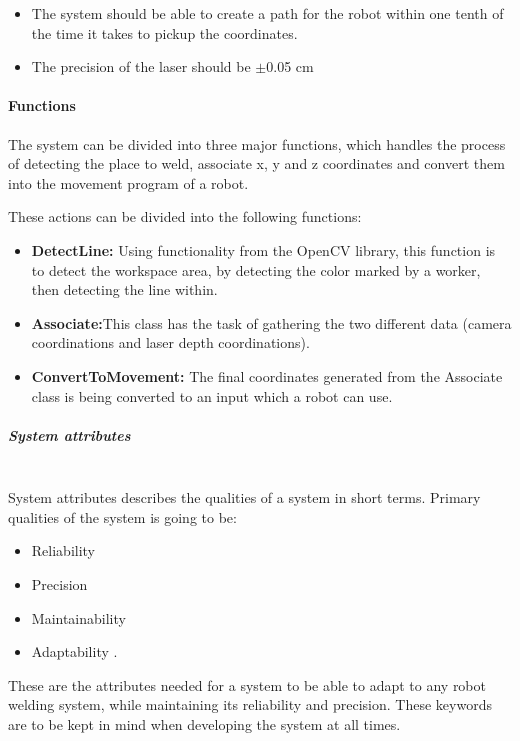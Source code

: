 \begin{itemize}

\item The system should be able to create a path for the robot within one tenth of the time it takes to pickup the coordinates.
\item The precision of the laser should be $\pm$0.05 cm

\end{itemize}

\paragraph*{Functions}

The system can be divided into three major functions, which handles the process of detecting the place to weld, associate x, y and z coordinates and convert them into the movement program of a robot.

These actions can be divided into the following functions:

\begin{itemize}

\item \textbf{DetectLine:} Using functionality from the OpenCV library, this function is to detect the workspace area, by detecting the color marked by a worker, then detecting the line within.
\item \textbf{Associate:}This class has the task of gathering the two different data (camera coordinations and laser depth coordinations).
\item \textbf{ConvertToMovement:} The final coordinates generated from the Associate class is being converted to an input which a robot can use. 

\end{itemize}

\subparagraph*{System attributes}~\\
System attributes describes the qualities of a system in short terms. Primary qualities of the system is going to be:

\begin{itemize}

\item Reliability
\item Precision
\item Maintainability
\item Adaptability
. 
\end{itemize}
These are the attributes needed for a system to be able to adapt to any robot welding system, while maintaining its reliability and precision. These keywords are to be kept in mind when developing the system at all times.

